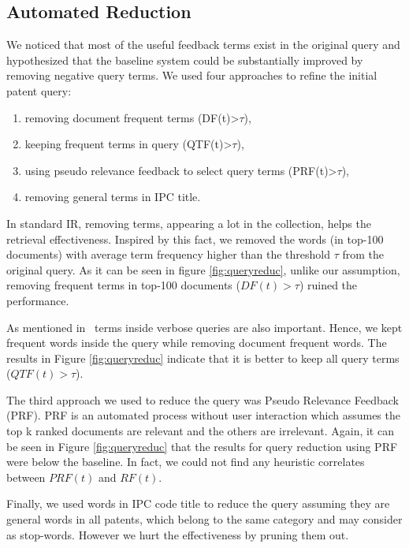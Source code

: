 \subsection{Automated Reduction}
We noticed that most of the useful feedback terms exist in the original query and hypothesized that the baseline system could be substantially improved by removing negative query terms. We used four approaches to refine the initial patent query: 
\begin{enumerate}
  \item removing document frequent terms (DF(t)>$\tau$),
  \item keeping frequent terms in query (QTF(t)>$\tau$),
  \item using pseudo relevance feedback to select query terms (PRF(t)>$\tau$), 
  \item removing general terms in IPC title. 
\end{enumerate}
In standard IR, removing terms, appearing a lot in the collection, helps the retrieval effectiveness. Inspired by this fact, we removed the words (in top-100 documents) with average term frequency higher than the threshold $\tau$ from the original query. As it can be seen in figure \ref{fig:queryreduc}, unlike our assumption, removing frequent terms in top-100 documents ($DF(t)>\tau$) ruined the performance.  

As mentioned in~\cite{maxwell2013compact} terms inside verbose queries are also important. Hence, we kept frequent words inside the query while removing document frequent words. The results in Figure \ref{fig:queryreduc} indicate that it is better to keep all query terms ($QTF(t)>\tau$). 

The third approach we used to reduce the query was Pseudo Relevance Feedback (PRF). PRF is an automated process without user interaction which assumes the top k ranked documents are relevant and the others are irrelevant. Again, it can be seen in Figure \ref{fig:queryreduc} that the results for query reduction using PRF were below the baseline. In fact, we could not find any heuristic correlates between  $ PRF(t)$ and $ RF(t)$. 

Finally, we used words in IPC code title to reduce the query assuming they are general words in all patents, which belong to the same category and may consider as stop-words. However we hurt the effectiveness by pruning them out.

